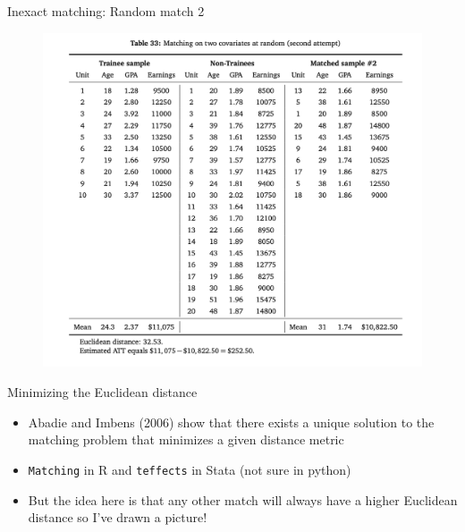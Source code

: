 \documentclass{beamer}
\begin{document}
\begin{frame}{Inexact matching: Random match 2}

\begin{figure}[!t]\centering
\includegraphics[scale=0.45]{./lecture_includes/inexact_random2}
\end{figure}

\end{frame}


\begin{frame}{Minimizing the Euclidean distance}

\begin{itemize}
\item Abadie and Imbens (2006) show that there exists a unique solution to the matching problem that minimizes a given distance metric 
\item \texttt{Matching} in R and \texttt{teffects} in Stata (not sure in python)
\item But the idea here is that any other match will always have a higher Euclidean distance so I've drawn a picture!
\end{itemize}

\end{frame}
\end{document}
